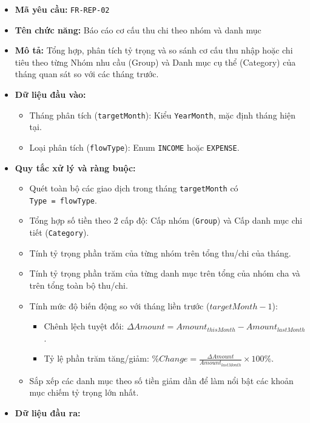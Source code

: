 \documentclass[11pt,a4paper]{article}
\providecommand{\tightlist}{
  \setlength{\itemsep}{0pt}\setlength{\parskip}{0pt}}
\begin{document}
\begin{itemize}
\tightlist
\item
  \textbf{Mã yêu cầu:} \texttt{FR-REP-02}
\item
  \textbf{Tên chức năng:} Báo cáo cơ cấu thu chi theo nhóm và danh mục
\item
  \textbf{Mô tả:} Tổng hợp, phân tích tỷ trọng và so sánh cơ cấu thu
  nhập hoặc chi tiêu theo từng Nhóm nhu cầu (Group) và Danh mục cụ thể
  (Category) của tháng quan sát so với các tháng trước.
\item
  \textbf{Dữ liệu đầu vào:}

  \begin{itemize}
  \tightlist
  \item
    Tháng phân tích (\texttt{targetMonth}): Kiểu \texttt{YearMonth}, mặc
    định tháng hiện tại.
  \item
    Loại phân tích (\texttt{flowType}): Enum \texttt{INCOME} hoặc
    \texttt{EXPENSE}.
  \end{itemize}
\item
  \textbf{Quy tắc xử lý và ràng buộc:}

  \begin{itemize}
  \tightlist
  \item
    Quét toàn bộ các giao dịch trong tháng \texttt{targetMonth} có
    \texttt{Type\ =\ flowType}.
  \item
    Tổng hợp số tiền theo 2 cấp độ: Cấp nhóm (\texttt{Group}) và Cấp
    danh mục chi tiết (\texttt{Category}).
  \item
    Tính tỷ trọng phần trăm của từng nhóm trên tổng thu/chi của tháng.
  \item
    Tính tỷ trọng phần trăm của từng danh mục trên tổng của nhóm cha và
    trên tổng toàn bộ thu/chi.
  \item
    Tính mức độ biến động so với tháng liền trước (\(targetMonth - 1\)):

    \begin{itemize}
    \tightlist
    \item
      Chênh lệch tuyệt đối:
      \(\Delta Amount = Amount_{thisMonth} - Amount_{lastMonth}\).
    \item
      Tỷ lệ phần trăm tăng/giảm:
      \(\% Change = \frac{\Delta Amount}{Amount_{lastMonth}} \times 100\%\).
    \end{itemize}
  \item
    Sắp xếp các danh mục theo số tiền giảm dần để làm nổi bật các khoản
    mục chiếm tỷ trọng lớn nhất.
  \end{itemize}
\item
  \textbf{Dữ liệu đầu ra:}


\end{itemize}
\end{document}
